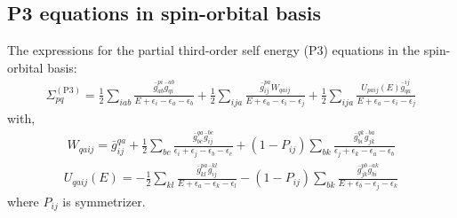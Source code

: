 \documentclass[journal=jacsat]{achemso}
\numberwithin{equation}{section}
\begin{document}
\subsection{P3 equations in spin-orbital basis}
The expressions for the partial third-order self energy (P3) equations in the spin-orbital basis:
\begin{align}
\Sigma_{pq}^{(\text{P}3)} =\frac{1}{2}\sum_{iab}\frac{\bar{g}^{pi}_{ab}\bar{g}^{ab}_{qi}}{E + \epsilon_{i}-\epsilon_{a}-\epsilon_{b}}+\frac{1}{2}\sum_{ija}\frac{\bar{g}^{pa}_{ij}W_{qaij}}{E + \epsilon_{a}-\epsilon_{i}-\epsilon_{j}}+\frac{1}{2}\sum_{ija}\frac{U_{paij}(E)\bar{g}^{ij}_{qa}}{E + \epsilon_{a}-\epsilon_{i}-\epsilon_{j}}
\end{align}
with,
\begin{align}
W_{qaij}=\bar{g}^{qa}_{ij}+\frac{1}{2}\sum_{bc}\frac{\bar{g}^{qa}_{bc}\bar{g}^{bc}_{ij}}{\epsilon_{i} + \epsilon_{j}-\epsilon_{b}-\epsilon_{c}}+(1-P_{ij})\sum_{bk}\frac{\bar{g}^{qk}_{bi}\bar{g}^{ba}_{jk}}{\epsilon_{j} + \epsilon_{k}-\epsilon_{a}-\epsilon_{b}}
\end{align}
\begin{align}
U_{qaij}(E)=-\frac{1}{2}\sum_{kl}\frac{\bar{g}^{pa}_{kl}\bar{g}^{kl}_{ij}}{E + \epsilon_{a}-\epsilon_{k}-\epsilon_{l}}-(1-P_{ij})\sum_{bk}\frac{\bar{g}^{pb}_{jk}\bar{g}^{ak}_{bi}}{E + \epsilon_{b}-\epsilon_{j}-\epsilon_{k}}
\end{align}
where $P_{ij}$ is symmetrizer.
\end{document}
